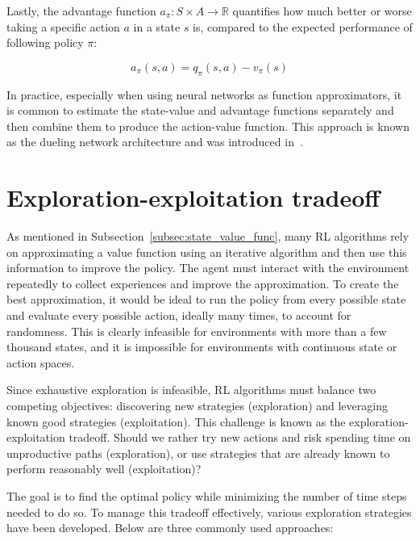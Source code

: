 \documentclass[
  digital,     %
  oneside,     %
  nosansbold,  %
  nocolorbold, %
  lof,         %
  lot,         %
]{fithesis4}
\begin{document}
Lastly, the advantage function $a_\pi\colon S \times A \to \mathbb{R}$ quantifies how much better or worse taking a specific action $a$ in a state $s$ is, compared to the expected performance of following policy $\pi$:

\begin{equation}
a_\pi(s,a) = q_\pi(s,a)-v_\pi(s)
\end{equation}

In practice, especially when using neural networks as function approximators, it is common to estimate the state-value and advantage functions separately and then combine them to produce the action-value function. This approach is known as the dueling network architecture and was introduced in~\cite{dueling_arch}.

\section{Exploration-exploitation tradeoff}
\label{sec:explor-exploit}
As mentioned in Subsection~\ref{subsec:state_value_func}, many RL algorithms rely on approximating a value function using an iterative algorithm and then use this information to improve the policy. The agent must interact with the environment repeatedly to collect experiences and improve the approximation. To create the best approximation, it would be ideal to run the policy from every possible state and evaluate every possible action, ideally many times, to account for randomness. This is clearly infeasible for environments with more than a few thousand states, and it is impossible for environments with continuous state or action spaces.

Since exhaustive exploration is infeasible, RL algorithms must balance two competing objectives: discovering new strategies (exploration) and leveraging known good strategies (exploitation). This challenge is known as the exploration-exploitation tradeoff. Should we rather try new actions and risk spending time on unproductive paths (exploration), or use strategies that are already known to perform reasonably well (exploitation)?

The goal is to find the optimal policy while minimizing the number of time steps needed to do so. To manage this tradeoff effectively, various exploration strategies have been developed. Below are three commonly used approaches:
\end{document}
